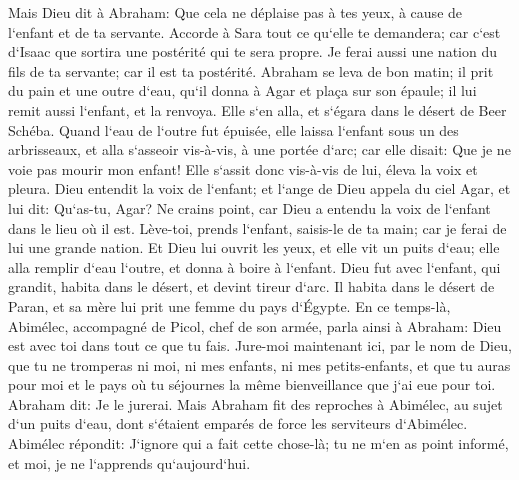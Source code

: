 \verse Mais Dieu dit à Abraham: Que cela ne déplaise pas à tes yeux, à cause de l`enfant et de ta servante. Accorde à Sara tout ce qu`elle te demandera; car c`est d`Isaac que sortira une postérité qui te sera propre. 
\verse Je ferai aussi une nation du fils de ta servante; car il est ta postérité. 
\verse Abraham se leva de bon matin; il prit du pain et une outre d`eau, qu`il donna à Agar et plaça sur son épaule; il lui remit aussi l`enfant, et la renvoya. Elle s`en alla, et s`égara dans le désert de Beer Schéba. 
\verse Quand l`eau de l`outre fut épuisée, elle laissa l`enfant sous un des arbrisseaux, 
\verse et alla s`asseoir vis-à-vis, à une portée d`arc; car elle disait: Que je ne voie pas mourir mon enfant! Elle s`assit donc vis-à-vis de lui, éleva la voix et pleura. 
\verse Dieu entendit la voix de l`enfant; et l`ange de Dieu appela du ciel Agar, et lui dit: Qu`as-tu, Agar? Ne crains point, car Dieu a entendu la voix de l`enfant dans le lieu où il est. 
\verse Lève-toi, prends l`enfant, saisis-le de ta main; car je ferai de lui une grande nation. 
\verse Et Dieu lui ouvrit les yeux, et elle vit un puits d`eau; elle alla remplir d`eau l`outre, et donna à boire à l`enfant. 
\verse Dieu fut avec l`enfant, qui grandit, habita dans le désert, et devint tireur d`arc. 
\verse Il habita dans le désert de Paran, et sa mère lui prit une femme du pays d`Égypte. 
\verse En ce temps-là, Abimélec, accompagné de Picol, chef de son armée, parla ainsi à Abraham: Dieu est avec toi dans tout ce que tu fais. 
\verse Jure-moi maintenant ici, par le nom de Dieu, que tu ne tromperas ni moi, ni mes enfants, ni mes petits-enfants, et que tu auras pour moi et le pays où tu séjournes la même bienveillance que j`ai eue pour toi. 
\verse Abraham dit: Je le jurerai. 
\verse Mais Abraham fit des reproches à Abimélec, au sujet d`un puits d`eau, dont s`étaient emparés de force les serviteurs d`Abimélec. 
\verse Abimélec répondit: J`ignore qui a fait cette chose-là; tu ne m`en as point informé, et moi, je ne l`apprends qu`aujourd`hui. 
